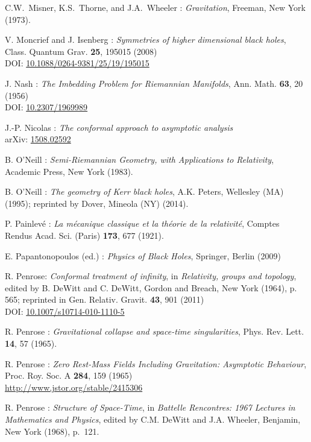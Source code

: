 \begin{thebibliography}{123}
C.W.~Misner, K.S.~Thorne, and J.A.~Wheeler : {\em Gravitation},
Freeman, New York (1973).

V. Moncrief and J. Isenberg : {\em Symmetries of higher dimensional black holes},
Class. Quantum Grav. {\bf 25}, 195015 (2008)\\
DOI: \href{http://dx.doi.org/10.1088/0264-9381/25/19/195015}{10.1088/0264-9381/25/19/195015}

J. Nash  :
{\em The Imbedding Problem for Riemannian Manifolds},
Ann. Math. {\bf 63}, 20 (1956)\\
DOI: \href{http://dx.doi.org/10.2307/1969989}{10.2307/1969989}

J.-P. Nicolas :
{\em The conformal approach to asymptotic analysis} \\
arXiv: \href{https://arxiv.org/abs/1508.02592}{1508.02592}

B. O'Neill : {\em Semi-Riemannian Geometry, with Applications to Relativity},
Academic Press, New York (1983).

B. O'Neill : {\em The geometry of Kerr black holes}, A.K. Peters, Wellesley (MA) (1995);
reprinted by Dover, Mineola (NY) (2014).

P. Painlevé : \emph{La mécanique classique et la théorie de la relativité},
Comptes Rendus Acad. Sci. (Paris) {\bf 173}, 677 (1921).

E. Papantonopoulos (ed.) : {\em Physics of Black Holes}, Springer, Berlin (2009)

R. Penrose: {\em Conformal treatment of infinity}, in {\em Relativity, groups and topology},
edited by B. DeWitt and C. DeWitt,
Gordon and Breach, New York (1964), p. 565; reprinted in
Gen. Relativ. Gravit. {\bf 43}, 901 (2011)\\
DOI: \href{https://doi.org/10.1007/s10714-010-1110-5}{10.1007/s10714-010-1110-5}

R. Penrose : {\em Gravitational collapse and space-time singularities},
Phys. Rev. Lett. {\bf 14}, 57 (1965).

R. Penrose :
{\em Zero Rest-Mass Fields Including Gravitation: Asymptotic Behaviour},
Proc. Roy. Soc. A {\bf 284}, 159 (1965)\\
\url{http://www.jstor.org/stable/2415306}

R. Penrose : {\em Structure of Space-Time},
in {\em Battelle Rencontres: 1967 Lectures in Mathematics and Physics},
edited by C.M. DeWitt and J.A. Wheeler,
Benjamin, New York (1968), p.~121.


\end{thebibliography}
